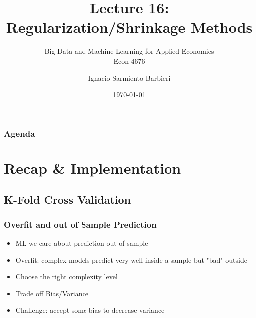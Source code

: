 \documentclass[
  shownotes,
  xcolor={svgnames},
  hyperref={colorlinks,citecolor=DarkBlue,linkcolor=DarkRed,urlcolor=DarkBlue}
  ]{beamer}
\begin{document}
\title[Lecture 16]{Lecture 16: \\ Regularization/Shrinkage Methods}
\subtitle{Big Data and Machine Learning for Applied Economics \\ Econ 4676}
\date{\today}

\author[Sarmiento-Barbieri]{Ignacio Sarmiento-Barbieri}


\begin{frame}[noframenumbering]
\maketitle
\end{frame}





\begin{frame}
\frametitle{Agenda}

\tableofcontents

\end{frame}

\section{Recap \& Implementation}
\subsection{K-Fold Cross Validation}
\begin{frame}[fragile]
\frametitle{Overfit and out of Sample Prediction}


\begin{itemize}
  \item ML we care about prediction out of sample
  \medskip
  \item Overfit: complex models predict very well inside a sample but "bad" outside
  \medskip
  \item Choose the right complexity level
  \medskip
  \item Trade off Bias/Variance
  \medskip
  \item Challenge: accept some bias to decrease variance
\end{itemize}

\end{frame}
\end{document}
